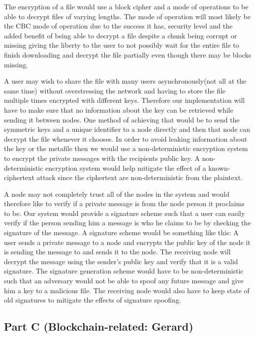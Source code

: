 \documentclass[12pt,a4paper,draft]{article}
\begin{document}
The encryption of  a file would use a block cipher and a mode of operations to be able to decrypt files of varying lengths. The mode of operation will most likely be the CBC mode of operation due to the success it has, security level and the added benefit of being able to decrypt a file despite a chunk being corrupt or missing giving the liberty to the user to not possibly wait for the entire file to finish downloading and decrypt the file partially even though there may be blocks missing. 

A user may wish to share the file with many users asynchronously(not all at the same time) without overstressing the network and having to store the file multiple times encrypted with different keys. Therefore our implementation will have to make sure that no information about the key can be retrieved while sending it between nodes. One method of achieving that would be to send the symmetric keys and a unique identifier to a node directly and then that node can decrypt the file whenever it chooses. In order to avoid leaking information about the key or the metafile then we would use a non-deterministic encryption system to encrypt the private messages with the recipients public key. A non-deterministic encryption system would help mitigate the effect of a known-ciphertext attack since the ciphertext are non-deterministic from the plaintext. 

A node may not completely trust all of the nodes in the system and would therefore like to verify if a private message is from the node person it proclaims to be. Our system would provide a signature scheme such that a user can easily verify if the person sending him a message is who he claims to be by checking the signature of the message. A signature scheme would be something like this: A user sends a private message to a node and encrypts the public key of the node it is sending the message to and sends it to the node. The receiving node will decrypt the message using the sender’s  public key and verify that it is a valid signature. The signature generation scheme would have to be non-deterministic such that an adversary would not be able to spoof any future message and give him a key to a malicious file. The receiving node would also have to keep state of old signatures to mitigate the effects of signature spoofing.

\subsection{Part C (Blockchain-related: Gerard)}
\end{document}
